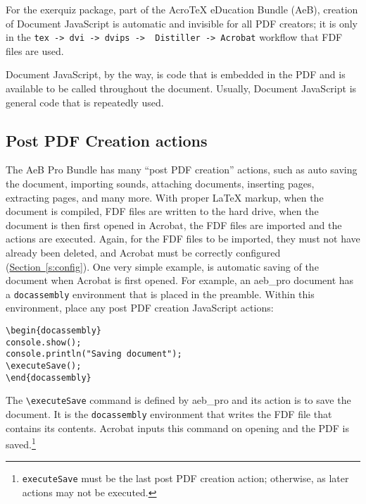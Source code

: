\documentclass{article}
\let\env\texttt
\def\cs#1{\texttt{\eqbs#1}}
\def\AEBP{\app{AeB Pro}}
\def\AEB{\app{AeB}}
\let\app\textsf
\let\pkg\textsf
\begin{document}
For the \pkg{exerquiz} package, part of the {Acro\!\TeX} eDucation Bundle
(\AEB), creation of Document JavaScript is automatic and invisible for all
PDF creators; it is only in the
\texttt{tex\,->\,dvi\,->\,\app{dvips}\,->\,\ignorespaces
\app{Distiller}\,->\,\app{Acrobat}} workflow that FDF files are used.

Document JavaScript, by the way, is code that is embedded in the PDF and is
available to be called throughout the document. Usually, Document JavaScript
is general code that is repeatedly used.


\subsection{Post PDF Creation actions}

The {\AEBP} Bundle has many ``post PDF creation'' actions, such as auto
saving the document, importing sounds, attaching documents, inserting pages,
extracting pages, and many more. With proper {\LaTeX} markup, when the
document is compiled, FDF files are written to the hard drive, when the
document is then first opened in \app{Acrobat}, the FDF files are imported
and the actions are executed. Again, for the FDF files to be imported, they
must not have already been deleted, and \app{Acrobat} must be correctly
configured (\hyperref[s:config]{Section~\ref*{s:config}}). One very simple
example, is automatic saving of the document when \app{Acrobat} is first
opened. For example, an \pkg{aeb\_pro} document has a \env{docassembly}
environment that is placed in the preamble. Within this environment, place
any post PDF creation JavaScript actions:
\begin{Verbatim}[xleftmargin=\parindent]
\begin{docassembly}
console.show();
console.println("Saving document");
\executeSave();
\end{docassembly}
\end{Verbatim}
The \verb~\executeSave~ command is defined by \pkg{aeb\_pro} and its action
is to save the document. It is the \env{docassembly} environment that writes
the FDF file that contains its contents. \app{Acrobat} inputs this command on
opening and the PDF is saved.\footnote{\cs{executeSave} must be the last post PDF
creation action; otherwise, as later actions may not be executed.}
\end{document}
